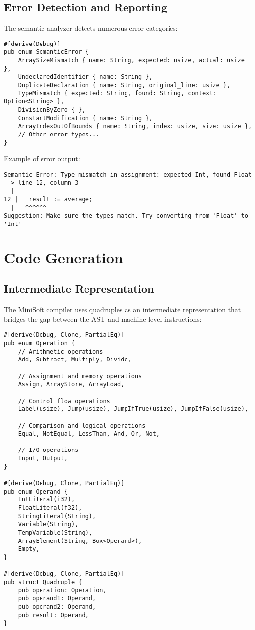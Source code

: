 \documentclass[12pt,a4paper]{article}
\begin{document}
\subsection{Error Detection and Reporting}
The semantic analyzer detects numerous error categories:

\begin{lstlisting}[caption={Semantic Error Types}]
#[derive(Debug)]
pub enum SemanticError {
    ArraySizeMismatch { name: String, expected: usize, actual: usize },
    UndeclaredIdentifier { name: String },
    DuplicateDeclaration { name: String, original_line: usize },
    TypeMismatch { expected: String, found: String, context: Option<String> },
    DivisionByZero { },
    ConstantModification { name: String },
    ArrayIndexOutOfBounds { name: String, index: usize, size: usize },
    // Other error types...
}
\end{lstlisting}

Example of error output:

\begin{lstlisting}[caption={Semantic Error Output}]
Semantic Error: Type mismatch in assignment: expected Int, found Float
--> line 12, column 3
  |
12 |   result := average;
  |   ^^^^^^
Suggestion: Make sure the types match. Try converting from 'Float' to 'Int'
\end{lstlisting}

\section{Code Generation}
\subsection{Intermediate Representation}
The MiniSoft compiler uses quadruples as an intermediate representation that bridges the gap between the AST and machine-level instructions:

\begin{lstlisting}[caption={Quadruple Structure}]
#[derive(Debug, Clone, PartialEq)]
pub enum Operation {
    // Arithmetic operations
    Add, Subtract, Multiply, Divide,
    
    // Assignment and memory operations
    Assign, ArrayStore, ArrayLoad,
    
    // Control flow operations
    Label(usize), Jump(usize), JumpIfTrue(usize), JumpIfFalse(usize),
    
    // Comparison and logical operations
    Equal, NotEqual, LessThan, And, Or, Not,
    
    // I/O operations
    Input, Output,
}

#[derive(Debug, Clone, PartialEq)]
pub enum Operand {
    IntLiteral(i32),
    FloatLiteral(f32),
    StringLiteral(String),
    Variable(String),
    TempVariable(String),
    ArrayElement(String, Box<Operand>),
    Empty,
}

#[derive(Debug, Clone, PartialEq)]
pub struct Quadruple {
    pub operation: Operation,
    pub operand1: Operand,
    pub operand2: Operand,
    pub result: Operand,
}
\end{lstlisting}
\end{document}
